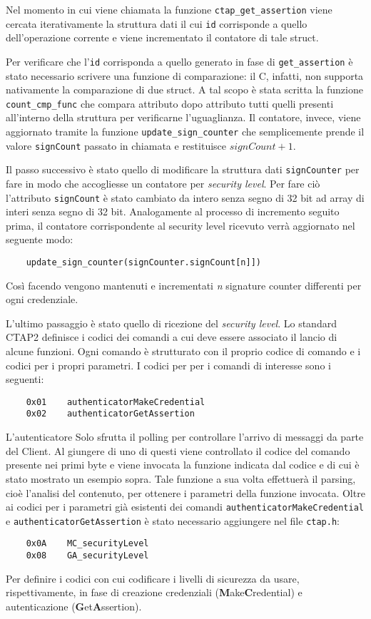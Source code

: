 Nel momento in cui viene chiamata la funzione \verb*|ctap_get_assertion| viene cercata iterativamente la struttura dati il cui \verb*|id| corrisponde a quello dell'operazione corrente e viene incrementato il contatore di tale struct. 

Per verificare che l'\verb*|id| corrisponda a quello generato in fase di \verb*|get_assertion| è stato necessario scrivere una funzione di comparazione: il C, infatti, non supporta nativamente la comparazione di due struct. A tal scopo è stata scritta la funzione \verb*|count_cmp_func| che compara attributo dopo attributo tutti quelli presenti all'interno della struttura per verificarne l'uguaglianza.
Il contatore, invece, viene aggiornato tramite la funzione \verb*|update_sign_counter| che semplicemente prende il valore \verb*|signCount| passato in chiamata e restituisce $signCount + 1$.

Il passo successivo è stato quello di modificare la struttura dati \verb*|signCounter| per fare in modo che accogliesse un contatore per \emph{security level}. Per fare ciò l'attributo \verb*|signCount| è stato cambiato da intero senza segno di 32 bit ad array di interi senza segno di 32 bit. Analogamente al processo di incremento seguito prima, il contatore corrispondente al security level ricevuto verrà aggiornato nel seguente modo:
\begin{verbatim}
	update_sign_counter(signCounter.signCount[n]])
\end{verbatim}
Così facendo vengono mantenuti e incrementati \emph{n} signature counter differenti per ogni credenziale. 


L'ultimo passaggio è stato quello di ricezione del \emph{security level}. Lo standard CTAP2 \cite{fido:ctap_commands} definisce i codici dei comandi a cui deve essere associato il lancio di alcune funzioni. Ogni comando è strutturato con il proprio codice di comando e i codici per i propri parametri. I codici per per i comandi di interesse sono i seguenti: 
\begin{verbatim}
	0x01	authenticatorMakeCredential
	0x02	authenticatorGetAssertion
\end{verbatim}


L'autenticatore Solo sfrutta il polling per controllare l'arrivo di messaggi da parte del Client. Al giungere di uno di questi viene controllato il codice del comando presente nei primi byte e viene invocata la funzione indicata dal codice e di cui è stato mostrato un esempio sopra. Tale funzione a sua volta effettuerà il parsing, cioè l'analisi del contenuto, per ottenere i parametri della funzione invocata. Oltre ai codici per i parametri già esistenti dei comandi \verb*|authenticatorMakeCredential| e \verb*|authenticatorGetAssertion| è stato necessario aggiungere nel file \verb*|ctap.h|:
\begin{verbatim}
	0x0A	MC_securityLevel
	0x08	GA_securityLevel
\end{verbatim}
Per definire i codici con cui codificare i livelli di sicurezza da usare, rispettivamente, in fase di creazione credenziali (\textbf{M}ake\textbf{C}redential) e autenticazione (\textbf{G}et\textbf{A}ssertion). 

